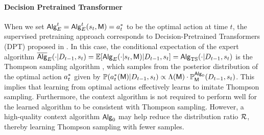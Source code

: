 
\paragraph{Decision Pretrained Transformer} When we set ${\mathsf{Alg}}_{E}^t = {\mathsf{Alg}}_{E}^t({s}_t,{\mathsf{M}})={a}^*_t$ to be the optimal action at time $t$, the supervised pretraining approach corresponds to Decision-Pretrained Transformers (DPT) proposed in \cite{lee2023supervised}. In this case, the conditional expectation of the expert algorithm $\overline{\mathsf{Alg}}_{E}(\cdot|{D}_{t-1},{s}_t)=\mathbb{E}[{\mathsf{Alg}}_{{E}}(\cdot|{s}_t,{\mathsf{M}})|{D}_{t-1},{s}_t]={\mathsf{Alg}}_{{\mathrm{TS}}}(\cdot|{D}_{t-1},{s}_t)$ is the Thompson sampling algorithm \citep[Theorem 1]{lee2023supervised}, which samples from the posterior distribution of the optimal action ${a}^*_t$ given by $\mathbb{P}(a^*_t({\mathsf{M}}) |{D}_{t-1},{s}_t)\propto {\Lambda}({\mathsf{M}})\cdot\mathbb{P}_{\mathsf{M}}^{{\mathsf{Alg}}_0}({D}_{t-1},{s}_t)$. This implies that learning from optimal actions effectively learns to imitate Thompson sampling. Furthermore, the context algorithm is not required to perform well for the learned algorithm to be consistent with Thompson sampling. However, a high-quality context algorithm ${\mathsf{Alg}}_0$ may help reduce the distribution ratio ${\mathcal{R}}$, thereby learning Thompson sampling with fewer samples. 





